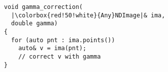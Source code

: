 \documentclass[varwidth=4.5cm,border={0.1cm 0.1cm 0.1cm 0.1cm}]{standalone}
\begin{document}
\begin{verbatim}
void gamma_correction(
  |\colorbox{red!50!white}{Any}NDImage|& ima,
  double gamma)
{
  for (auto pnt : ima.points())
    auto& v = ima(pnt);
    // correct v with gamma
}
\end{verbatim}
\end{document}
